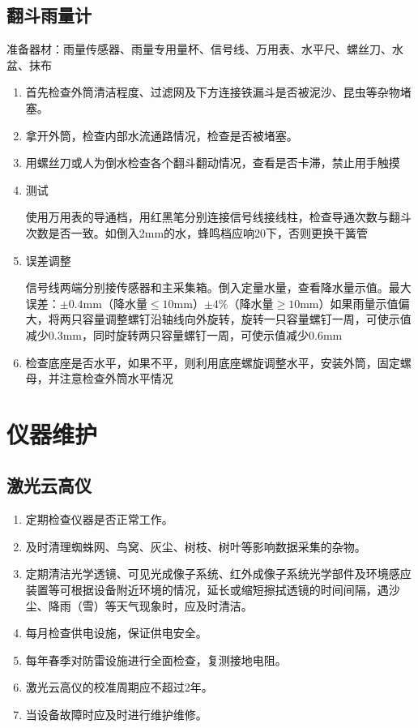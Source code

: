 ﻿\documentclass[UTF8,11pt]{ctexbook}%
\begin{document}
\section{翻斗雨量计}

准备器材：雨量传感器、雨量专用量杯、信号线、万用表、水平尺、螺丝刀、水盆、抹布
\begin{enumerate}
	\item 首先检查外筒清洁程度、过滤网及下方连接铁漏斗是否被泥沙、昆虫等杂物堵塞。
	\item 拿开外筒，检查内部水流通路情况，检查是否被堵塞。
	\item 用螺丝刀或人为倒水检查各个翻斗翻动情况，查看是否卡滞，禁止用手触摸
	\item 测试\par\qquad
	使用万用表的导通档，用红黑笔分别连接信号线接线柱，检查导通次数与翻斗次数是否一致。如倒入2mm的水，蜂鸣档应响20下，否则更换干簧管
	\item 误差调整\par\qquad
	信号线两端分别接传感器和主采集箱。倒入定量水量，查看降水量示值。最大误差：\(\pm0.4\mathrm{mm}\)（降水量\(\leq10\mathrm{mm}\)）\(\pm4\)\%（降水量\(\geq10\mathrm{mm}\)）如果雨量示值偏大，将两只容量调整螺钉沿轴线向外旋转，旋转一只容量螺钉一周，可使示值减少0.3mm，同时旋转两只容量螺钉一周，可使示值减少0.6mm
	\item 检查底座是否水平，如果不平，则利用底座螺旋调整水平，安装外筒，固定螺母，并注意检查外筒水平情况
\end{enumerate}

\chapter{仪器维护}

\section{激光云高仪}
\begin{enumerate}
	\item 定期检查仪器是否正常工作。
	\item 及时清理蜘蛛网、鸟窝、灰尘、树枝、树叶等影响数据采集的杂物。
	\item 定期清洁光学透镜、可见光成像子系统、红外成像子系统光学部件及环境感应装置等可根据设备附近环境的情况，延长或缩短擦拭透镜的时间间隔，遇沙尘、降雨（雪）等天气现象时，应及时清洁。
	\item 每月检查供电设施，保证供电安全。
	\item 每年春季对防雷设施进行全面检查，复测接地电阻。
	\item 激光云高仪的校准周期应不超过2年。
	\item 当设备故障时应及时进行维护维修。
\end{enumerate}
\end{document}
